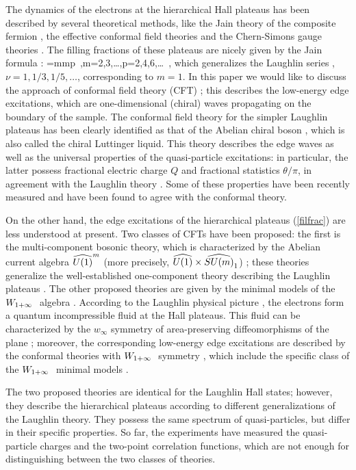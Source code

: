 The dynamics of the electrons at the hierarchical Hall plateaus 
\cite{prange} has been 
described by several theoretical methods, like the Jain theory of the 
composite fermion \cite{jain}, the effective conformal field theories
\cite{wen} and the Chern-Simons gauge theories \cite{lofra}.
The filling fractions of these plateaus are nicely given by the
Jain formula \cite{jain}:
\beq
\nu={m\over mp}\ ,\qquad\qquad m=2,3,\dots,\quad p=2,4,6,\dots\ ,
\label{filfrac}\eeq
which generalizes the Laughlin series \cite{laugh}, $\nu=1,1/3,1/5,\dots$, 
corresponding to $m=1$. 
In this paper we would like to discuss the approach of
conformal field theory (CFT) \cite{cft}; this
describes the low-energy edge excitations, which are
one-dimensional (chiral) waves propagating on the boundary of the sample.
The conformal field theory for the simpler Laughlin plateaus
has been clearly identified as that of the Abelian chiral
boson \cite{wen}, which is also called the chiral Luttinger liquid.
This theory describes the edge waves as well as
the universal properties of the quasi-particle excitations:
in particular, the latter possess fractional electric charge $Q$ and 
fractional statistics $\theta/\pi$, in agreement with the Laughlin 
theory \cite{laugh}.
Some of these properties have been recently measured \cite{expe}
and have been found to agree with the conformal theory.

On the other hand, the edge excitations of the hierarchical plateaus
(\ref{filfrac}) are less understood at present.
Two classes of CFTs  have been proposed: 
the first is the multi-component bosonic theory, which is 
characterized by the Abelian current algebra $\u1^m$ (more precisely,
$\u1\times\suem$) \cite{abe}; these theories generalize the well-established 
one-component theory describing the Laughlin plateaus \cite{wen}.
The other proposed theories are given by the minimal models of 
the $W_{1+\infty}\ $ algebra \cite{ctz5}. 
According to the Laughlin physical picture \cite{laugh}, 
the electrons form a quantum incompressible fluid at the Hall plateaus.
This fluid can be characterized by the $w_\infty$ symmetry of 
area-preserving diffeomorphisms of the plane \cite{ctz1}\cite{sakita}; 
moreover, the corresponding low-energy edge excitations are described by the
conformal theories with $W_{1+\infty}\ $ symmetry \cite{cdtz1}, which include 
the specific class of the $W_{1+\infty}\ $ minimal models \cite{ctz5}.

The two proposed theories are identical for the Laughlin
Hall states; however, they describe the hierarchical
plateaus according to different generalizations of the Laughlin theory. 
They possess the same spectrum of quasi-particles, 
but differ in their specific properties.
So far, the experiments have measured
the quasi-particle charges and the two-point correlation functions,
which are not enough for distinguishing between the two classes of theories.

